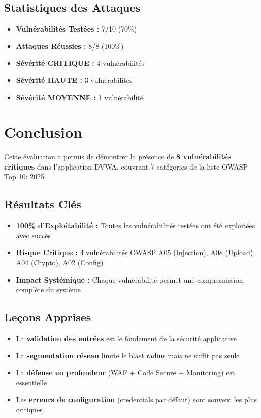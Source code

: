 \documentclass[12pt,a4paper,openany]{report}
\begin{document}
	\section{Statistiques des Attaques}
	
	\begin{itemize}
		\item \textbf{Vulnérabilités Testées :} 7/10 (70\%)
		\item \textbf{Attaques Réussies :} 8/8 (100\%)
		\item \textbf{Sévérité CRITIQUE :} 4 vulnérabilités
		\item \textbf{Sévérité HAUTE :} 3 vulnérabilités
		\item \textbf{Sévérité MOYENNE :} 1 vulnérabilité
	\end{itemize}

	
	
	\chapter{Conclusion}
	
	Cette évaluation a permis de démontrer la présence de \textbf{8 vulnérabilités critiques} 
	dans l'application DVWA, couvrant 7 catégories de la liste OWASP Top 10: 2025.
	
	\section{Résultats Clés}
	
	\begin{itemize}
		\item \textbf{100\% d'Exploitabilité :} Toutes les vulnérabilités testées ont été exploitées avec succès
		\item \textbf{Risque Critique :} 4 vulnérabilités OWASP A05 (Injection), A08 (Upload), A04 (Crypto), A02 (Config)
		\item \textbf{Impact Systémique :} Chaque vulnérabilité permet une compromission complète du système
	\end{itemize}
	
	\section{Leçons Apprises}
	
	\begin{itemize}
		\item La \textbf{validation des entrées} est le fondement de la sécurité applicative
		\item La \textbf{segmentation réseau} limite le blast radius mais ne suffit pas seule
		\item La \textbf{défense en profondeur} (WAF + Code Secure + Monitoring) est essentielle
		\item Les \textbf{erreurs de configuration} (credentials par défaut) sont souvent les plus critiques
	\end{itemize}
	
\end{document}
